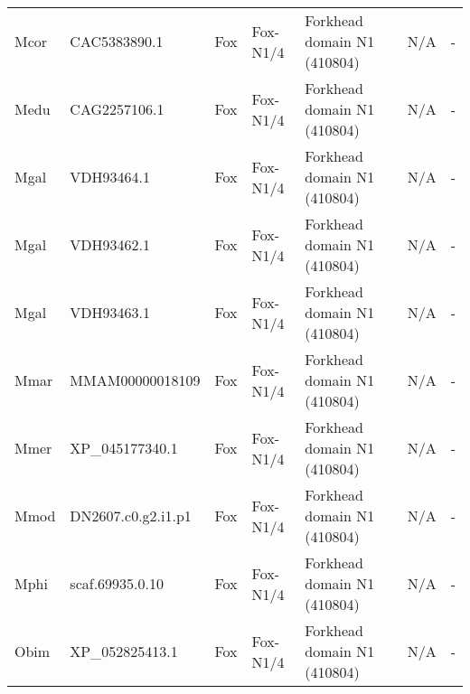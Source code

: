\documentclass[../main.tex]{subfiles}
\begin{document}
\begin{landscape}
\begin{longtable}{lllllll}
		Mcor           & CAC5383890.1          & Fox            & Fox-N1/4            & Forkhead domain N1 (410804)                 & N/A                                                                    & -                    \\
		Medu           & CAG2257106.1          & Fox            & Fox-N1/4            & Forkhead domain N1 (410804)                 & N/A                                                                    & -                    \\
		Mgal           & VDH93464.1            & Fox            & Fox-N1/4            & Forkhead domain N1 (410804)                 & N/A                                                                    & -                    \\
		Mgal           & VDH93462.1            & Fox            & Fox-N1/4            & Forkhead domain N1 (410804)                 & N/A                                                                    & -                    \\
		Mgal           & VDH93463.1            & Fox            & Fox-N1/4            & Forkhead domain N1 (410804)                 & N/A                                                                    & -                    \\
		Mmar           & MMAM00000018109       & Fox            & Fox-N1/4            & Forkhead domain N1 (410804)                 & N/A                                                                    & -                    \\
		Mmer           & XP\_045177340.1       & Fox            & Fox-N1/4            & Forkhead domain N1 (410804)                 & N/A                                                                    & -                    \\
		Mmod           & DN2607.c0.g2.i1.p1    & Fox            & Fox-N1/4            & Forkhead domain N1 (410804)                 & N/A                                                                    & -                    \\
		Mphi           & scaf.69935.0.10       & Fox            & Fox-N1/4            & Forkhead domain N1 (410804)                 & N/A                                                                    & -                    \\
		Obim           & XP\_052825413.1       & Fox            & Fox-N1/4            & Forkhead domain N1 (410804)                 & N/A                                                                    & -                    \\

\end{longtable}
\end{landscape}
\end{document}
